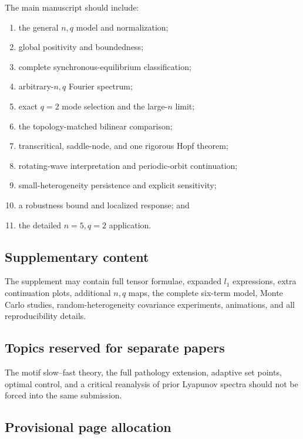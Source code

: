 \documentclass[11pt, reqno]{amsart}
\theoremstyle{definition}
\theoremstyle{remark}
\begin{document}
	The main manuscript should include:
	\begin{enumerate}[label=(\roman*),leftmargin=2.5em]
		\item the general $n,q$ model and normalization;
		\item global positivity and boundedness;
		\item complete synchronous-equilibrium classification;
		\item arbitrary-$n,q$ Fourier spectrum;
		\item exact $q=2$ mode selection and the large-$n$ limit;
		\item the topology-matched bilinear comparison;
		\item transcritical, saddle-node, and one rigorous Hopf theorem;
		\item rotating-wave interpretation and periodic-orbit continuation;
		\item small-heterogeneity persistence and explicit sensitivity;
		\item a robustness bound and localized response; and
		\item the detailed $n=5,q=2$ application.
	\end{enumerate}
	
	\subsection{Supplementary content}
	
	The supplement may contain full tensor formulae, expanded $l_1$ expressions,
	extra continuation plots, additional $n,q$ maps, the complete six-term model,
	Monte Carlo studies, random-heterogeneity covariance experiments, animations,
	and all reproducibility details.
	
	\subsection{Topics reserved for separate papers}
	
	The motif slow--fast theory, the full pathology extension, adaptive set points,
	optimal control, and a critical reanalysis of prior Lyapunov spectra should not
	be forced into the same submission.
	
	\subsection{Provisional page allocation}
	
\end{document}

